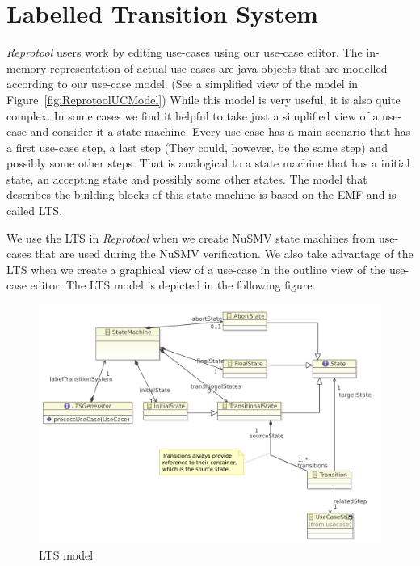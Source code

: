\section{Labelled Transition System}

\emph{Reprotool} users work by editing use-cases using our use-case editor.
The in-memory representation of actual use-cases are java objects that are modelled according to our use-case model. (See a simplified view of the model in Figure~\ref{fig:ReprotoolUCModel})
While this model is very useful, it is also quite complex. In some cases we find it helpful to take just a simplified view of a use-case and consider it a state machine.
Every use-case has a main scenario that has a first use-case step, a last step (They could,
however, be the same step) and possibly some other steps. That is analogical to a state machine that has a initial state, an accepting state and possibly some other states.
The model that describes the building blocks of this state machine is based on the \ac{EMF} and is called \ac{LTS}.

We use the \ac{LTS} in \emph{Reprotool} when we create NuSMV state machines from use-cases that are used during the NuSMV verification. We also take advantage of the \ac{LTS} when we create a graphical view of a use-case in the outline view of the
use-case editor. The \ac{LTS} model is depicted in the following figure.

\begin{figure}[ht]
  \centering
  \includegraphics[width=\textwidth]{images/lts}
  \caption{\ac{LTS} model}
  \label{fig:ReprotoolLTSModel}
\end{figure}

